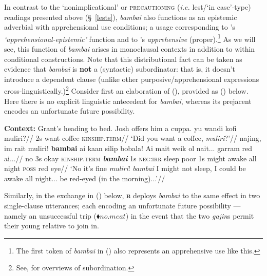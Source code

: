 In contrast to the `nonimplicational' or \textsc{precautioning} (\textit{i.e. }{\sc lest}/`in case'-type) readings presented above (\S~\ref{lests}), \textit{bambai} also functions as an epistemic adverbial with apprehensional use conditions; a usage corresponding to  \citeauthor{Lichtenberk1995}'s \textit{`apprehensional-epistemic'} function and to \citeauthor{Vuillermet2018}'s \textit{apprehensive} (proper).\footnote{The first token of \textit{bambai} in () also represents an apprehensive use like this.} As we will see, this function of \textit{bambai} arises in monoclausal contexts in addition to within conditional constructions. Note that this distributional fact can be taken as evidence that \textit{bambai} is \textbf{not} a (syntactic) subordinator: that is, it doesn't introduce a dependent clause (unlike other purposive/apprehensional expressions cross-linguistically.)\footnote{See, \citealp[\textit{e.g.},][]{Bluhdorn2008,Cristofaro2005} for overviews of subordination.} Consider first an elaboration of (), provided as () below. Here there is no explicit linguistic antecedent for \textit{bambai}, whereas its prejacent encodes an unfortunate future possibility.


\pex[everylabel=\sc]\textbf{Context:} Grant's heading to bed. Josh offers him a cuppa.
\a[label=j]\begingl \gla yu wandi kofi muliri?//
\glb 2s want coffee \textsc{kinship.term}//
\glft`Did you want a coffee, \textit{muliri}?'//\endgl
\a[label=g]\begingl \gla	najing, im rait muliri! \textbf{bambai} ai kaan silip bobala! Ai mait weik ol nait... garram red ai...//
\glb no 3s okay \textsc{kinship.term} \textit{\textbf{bambai}} 1s \textsc{neg:irr} sleep poor 1s might awake all night \textsc{poss} red eye//
\glft`No it's fine \textit{muliri}! \textit{bambai} I might not sleep, I could be awake all night... be red-eyed (in the morning)...'\trailingcitation{[GT~16032017~17']}//\endgl\xe

\noindent Similarly, in the exchange in () below, \textsc{\textbf{b}} deploys \textit{bambai} to the same effect in two single-clause utterances; each encoding an unfortunate future possibility --- namely an unsuccessful trip ($ \blacklozenge \textit{no.meat} $) in the event that the two \textit{gajin}s permit their young relative to join in.


